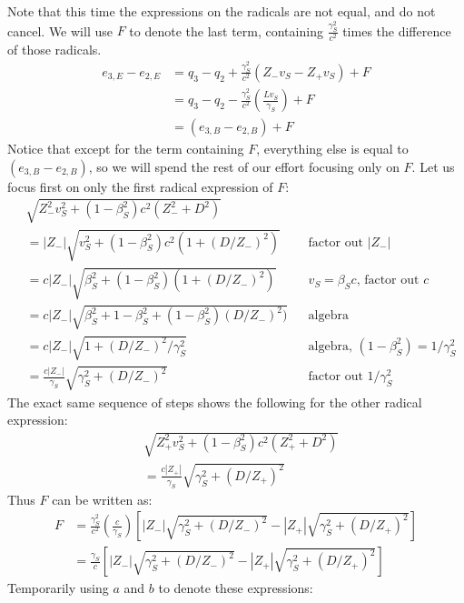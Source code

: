 \documentclass[a4paper]{article}
\theoremstyle{plain}
\theoremstyle{definition}
\begin{document}
Note that this time the expressions on the radicals are not equal, and
do not cancel.  We will use $F$ to denote the last term, containing
$\frac{\gamma_S^2}{c^2}$ times the difference of those radicals.
\begin{align}
e_{3,E}-e_{2,E}
  & = q_3 - q_2 + \frac{\gamma_S^2}{c^2} ( Z_{-}v_S - Z_{+}v_S ) + F \nonumber \\
  & = q_3 - q_2 - \frac{\gamma_S^2}{c^2} ( \frac{Lv_S}{\gamma_S} ) + F \nonumber \\
  & = (e_{3,B}-e_{2,B}) + F \label{eqn:scen2b-observerE-intermediatestep}
\end{align}
Notice that except for the term containing $F$, everything else is
equal to $(e_{3,B}-e_{2,B})$, so we will spend the rest of our effort
focusing only on $F$.  Let us focus first on only the first radical
expression of $F$:
\begin{align*}
  &   \sqrt{ Z_{-}^2v_S^2 + (1-\beta_S^2)c^2(Z_{-}^2 + D^2) } \\
  & = |Z_{-}| \sqrt{ v_S^2 + (1-\beta_S^2)c^2(1 + (D/Z_{-})^2) } & & \text{factor out $|Z_{-}|$} \\
  & = c|Z_{-}| \sqrt{ \beta_S^2 + (1-\beta_S^2)(1 + (D/Z_{-})^2) } & & \text{$v_S=\beta_S c$, factor out $c$} \\
  & = c|Z_{-}| \sqrt{ \beta_S^2 + 1-\beta_S^2 + (1-\beta_S^2)(D/Z_{-})^2) } & & \text{algebra} \\
  & = c|Z_{-}| \sqrt{ 1 + (D/Z_{-})^2/\gamma_S^2 } & & \text{algebra, $(1-\beta_S^2) = 1/\gamma_S^2$} \\
  & = \frac{c|Z_{-}|}{\gamma_S} \sqrt{ \gamma_S^2 + (D/Z_{-})^2 } & & \text{factor out $1/\gamma_S^2$}
\end{align*}
The exact same sequence of steps shows the following for the other
radical expression:
\begin{align*}
  &   \sqrt{ Z_{+}^2v_S^2 + (1-\beta_S^2)c^2(Z_{+}^2 + D^2) } \\
  & = \frac{c|Z_{+}|}{\gamma_S} \sqrt{ \gamma_S^2 + (D/Z_{+})^2 }
\end{align*}
Thus $F$ can be written as:
\begin{align*}
F
  & = \frac{\gamma_S^2}{c^2} (\frac{c}{\gamma_S}) \left[ |Z_{-}| \sqrt{ \gamma_S^2 + (D/Z_{-})^2 } - |Z_{+}| \sqrt{ \gamma_S^2 + (D/Z_{+})^2 } \right] \\
  & = \frac{\gamma_S}{c} \left[ |Z_{-}| \sqrt{ \gamma_S^2 + (D/Z_{-})^2 } - |Z_{+}| \sqrt{ \gamma_S^2 + (D/Z_{+})^2 } \right]
\end{align*}
Temporarily using $a$ and $b$ to denote these expressions:
\end{document}
